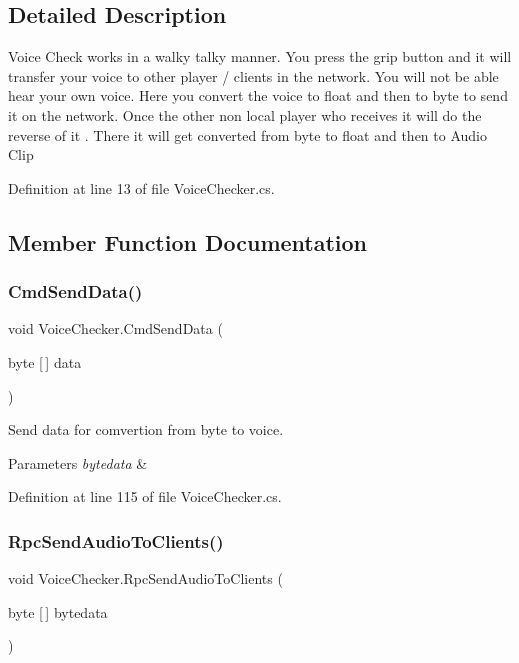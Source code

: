 \subsection{Detailed Description}
Voice Check works in a walky talky manner. You press the grip button and it will transfer your voice to other player / clients in the network. You will not be able hear your own voice. Here you convert the voice to float and then to byte to send it on the network. Once the other non local player who receives it will do the reverse of it . There it will get converted from byte to float and then to Audio Clip 



Definition at line 13 of file Voice\+Checker.\+cs.



\subsection{Member Function Documentation}
\mbox{\label{class_voice_checker_a644fb76d9672b803832faa1a2f59ea37}} 
\subsubsection{\texorpdfstring{CmdSendData()}{CmdSendData()}}
{\footnotesize\ttfamily void Voice\+Checker.\+Cmd\+Send\+Data (\begin{DoxyParamCaption}\item[{byte \mbox{[}$\,$\mbox{]}}]{data }\end{DoxyParamCaption})}



Send data for comvertion from byte to voice. 


\begin{DoxyParams}{Parameters}
{\em bytedata} & \\
\hline
\end{DoxyParams}


Definition at line 115 of file Voice\+Checker.\+cs.

\mbox{\label{class_voice_checker_acb5390e90e3b8cff019e2780a32be0d3}} 
\subsubsection{\texorpdfstring{RpcSendAudioToClients()}{RpcSendAudioToClients()}}
{\footnotesize\ttfamily void Voice\+Checker.\+Rpc\+Send\+Audio\+To\+Clients (\begin{DoxyParamCaption}\item[{byte \mbox{[}$\,$\mbox{]}}]{bytedata }\end{DoxyParamCaption})}



